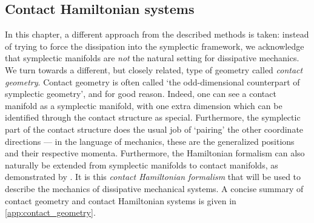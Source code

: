 \subsection{Contact Hamiltonian systems} 
In this chapter, a different approach from the described methods is taken: instead of trying to force the dissipation into the symplectic framework, we acknowledge that symplectic manifolds are \emph{not} the natural setting for dissipative mechanics. We turn towards a different, but closely related, type of geometry called \emph{contact geometry}. Contact geometry is often called `the odd-dimensional counterpart of symplectic geometry', and for good reason. Indeed, one can see a contact manifold as a symplectic manifold, with one extra dimension which can be identified through the contact structure as special. Furthermore, the symplectic part of the contact structure does the usual job of `pairing' the other coordinate directions --- in the language of mechanics, these are the generalized positions and their respective momenta. Furthermore, the Hamiltonian formalism can also naturally be extended from symplectic manifolds to contact manifolds, as demonstrated by \citet{Arnold1989}. It is this \emph{contact Hamiltonian formalism} that will be used to describe the mechanics of dissipative mechanical systems. A concise summary of contact geometry and contact Hamiltonian systems is given in \cref{app:contact_geometry}.

